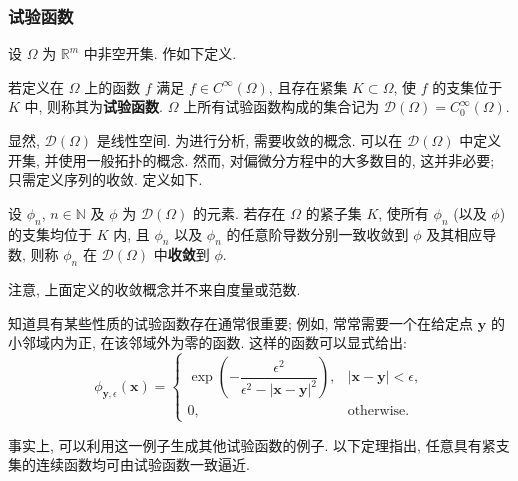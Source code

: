 \subsubsection{试验函数}\label{subsec:test-functions}

设 $\Omega$ 为 $\mathbb{R}^m$ 中非空开集. 作如下定义.

\begin{Definition}
\label{def:test-function}
若定义在 $\Omega$ 上的函数 $f$ 满足 $f\in C^\infty(\Omega)$, 且存在紧集 $K\subset\Omega$, 使 $f$ 的支集位于 $K$ 中, 则称其为\textbf{试验函数}. $\Omega$ 上所有试验函数构成的集合记为 $\mathcal{D}(\Omega)=C_0^\infty(\Omega)$.
\end{Definition}

显然, $\mathcal{D}(\Omega)$ 是线性空间. 为进行分析, 需要收敛的概念. 可以在 $\mathcal{D}(\Omega)$ 中定义开集, 并使用一般拓扑的概念. 然而, 对偏微分方程中的大多数目的, 这并非必要; 只需定义序列的收敛. 定义如下.

\begin{Definition}
\label{def:test-function-convergence}
设 $\phi_n$, $n\in\mathbb{N}$ 及 $\phi$ 为 $\mathcal{D}(\Omega)$ 的元素. 若存在 $\Omega$ 的紧子集 $K$, 使所有 $\phi_n$ (以及 $\phi$) 的支集均位于 $K$ 内, 且 $\phi_n$ 以及 $\phi_n$ 的任意阶导数分别一致收敛到 $\phi$ 及其相应导数, 则称 $\phi_n$ 在 $\mathcal{D}(\Omega)$ 中\textbf{收敛}到 $\phi$.
\end{Definition}

\begin{Remark}
\label{rem:test-function-convergence-nonmetric}
注意, 上面定义的收敛概念并不来自度量或范数.
\end{Remark}

知道具有某些性质的试验函数存在通常很重要; 例如, 常常需要一个在给定点 $\bm{y}$ 的小邻域内为正, 在该邻域外为零的函数. 这样的函数可以显式给出:
\begin{equation}\label{eq:smooth-compact-bump-function}
\phi_{\bm{y},\epsilon}(\bm{x})=\begin{cases}\exp\left(-\dfrac{\epsilon^2}{\epsilon^2-|\bm{x}-\bm{y}|^2}\right),&|\bm{x}-\bm{y}|<\epsilon,\\0,&\text{otherwise.}\end{cases}
\end{equation}


事实上, 可以利用这一例子生成其他试验函数的例子. 以下定理指出, 任意具有紧支集的连续函数均可由试验函数一致逼近.

